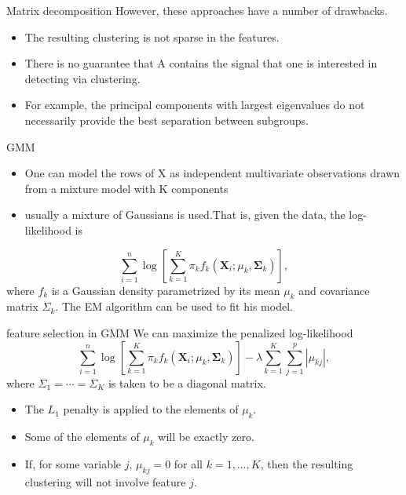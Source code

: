\documentclass[12pt]{beamer}
\begin{document}
\begin{frame}{Matrix decomposition}
However, these approaches have a number of drawbacks.
\begin{itemize}
\item The resulting clustering is not sparse in the features.
\item There is no guarantee that A contains the signal
that one is interested in detecting via clustering. 
\item For example, the principal components with largest eigenvalues
do not necessarily provide the best separation between subgroups.
\end{itemize}
\end{frame}

\begin{frame}{GMM}
\begin{itemize}
\item One can model the rows of X as independent
multivariate observations drawn from a mixture model
with K components
\item usually a mixture of Gaussians is used.That is, given the data, the log-likelihood is
\end{itemize}
$$
\sum_{i=1}^{n} \log \left[\sum_{k=1}^{K} \pi_{k} f_{k}\left(\mathbf{X}_{i} ; \mu_{k}, \mathbf{\Sigma}_{k}\right)\right],
$$
where $f_k$ is a Gaussian density parametrized by its mean $\mu_k$ and covariance matrix $\Sigma_k$. The EM algorithm can be used to fit his model.
\end{frame}

\begin{frame}{feature selection in GMM}
We can maximize the penalized log-likelihood
$$
\sum_{i=1}^{n} \log \left[\sum_{k=1}^{K} \pi_{k} f_{k}\left(\mathbf{X}_{i} ; \mu_{k}, \mathbf{\Sigma}_{k}\right)\right]-\lambda \sum_{k=1}^{K} \sum_{j=1}^{p}\left|\mu_{k j}\right|,
$$
where $\Sigma_{1}=\cdots=\Sigma_{K}$ is taken to be a diagonal matrix.
\begin{itemize}
\item The $L_1$ penalty is applied to the elements of $\mu_k$.
\item Some of the elements of $\mu_k$ will be exactly zero.
\item If, for some variable $j$, $\mu_{kj}=0$ for all $k=1,\dots,K$, then the resulting clustering
will not involve feature $j$.
\end{itemize}
\end{frame}
\end{document}
